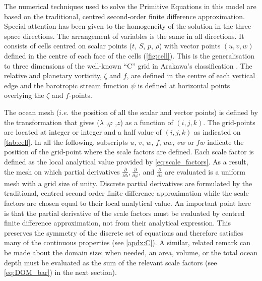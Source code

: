 \documentclass[../main/NEMO_manual]{subfiles}
\begin{document}
The numerical techniques used to solve the Primitive Equations in this model are based on the traditional,
centred second-order finite difference approximation.
Special attention has been given to the homogeneity of the solution in the three space directions.
The arrangement of variables is the same in all directions.
It consists of cells centred on scalar points ($t$, $S$, $p$, $\rho$) with vector points $(u, v, w)$ defined in
the centre of each face of the cells (\autoref{fig:cell}).
This is the generalisation to three dimensions of the well-known ``C'' grid in Arakawa's classification
\citep{Mesinger_Arakawa_Bk76}.
The relative and planetary vorticity, $\zeta$ and $f$, are defined in the centre of each vertical edge and
the barotropic stream function $\psi$ is defined at horizontal points overlying the $\zeta$ and $f$-points.

The ocean mesh ($i.e.$ the position of all the scalar and vector points) is defined by
the transformation that gives ($\lambda$ ,$\varphi$ ,$z$) as a function of $(i,j,k)$.
The grid-points are located at integer or integer and a half value of $(i,j,k)$ as indicated on \autoref{tab:cell}.
In all the following, subscripts $u$, $v$, $w$, $f$, $uw$, $vw$ or $fw$ indicate the position of
the grid-point where the scale factors are defined.
Each scale factor is defined as the local analytical value provided by \autoref{eq:scale_factors}.
As a result,
the mesh on which partial derivatives $\frac{\partial}{\partial \lambda}, \frac{\partial}{\partial \varphi}$,
and $\frac{\partial}{\partial z} $ are evaluated is a uniform mesh with a grid size of unity.
Discrete partial derivatives are formulated by the traditional,
centred second order finite difference approximation while
the scale factors are chosen equal to their local analytical value.
An important point here is that the partial derivative of the scale factors must be evaluated by
centred finite difference approximation, not from their analytical expression.
This preserves the symmetry of the discrete set of equations and
therefore satisfies many of the continuous properties (see \autoref{apdx:C}).
A similar, related remark can be made about the domain size:
when needed, an area, volume, or the total ocean depth must be evaluated as the sum of the relevant scale factors
(see \autoref{eq:DOM_bar}) in the next section).
\end{document}
